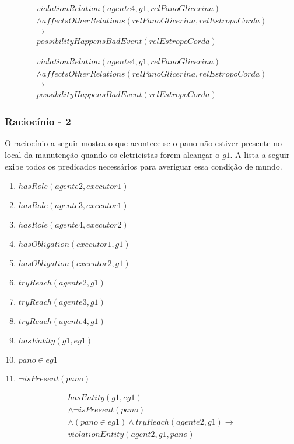 \begin{eqnarray}\nonumber
	violationRelation(agente4,g1,relPanoGlicerina)  \nonumber \\ 
	\wedge affectsOtherRelations(relPanoGlicerina,relEstropoCorda)   \nonumber \\ 
	\to \nonumber \\  
	possibilityHappensBadEvent(relEstropoCorda) 
\end{eqnarray}

\begin{eqnarray}\nonumber
	violationRelation(agente4,g1,relPanoGlicerina)  \nonumber \\ 
	\wedge affectsOtherRelations(relPanoGlicerina,relEstropoCorda)   \nonumber \\ 
	\to \nonumber \\  
	possibilityHappensBadEvent(relEstropoCorda) 
\end{eqnarray}



\subsubsection{Raciocínio - 2} 

O raciocínio a seguir mostra o que acontece se o pano não estiver presente no local da manutenção quando os eletricistas forem alcançar o $g1$. A lista a seguir exibe todos os predicados necessários para averiguar essa condição de mundo. 


\begin{enumerate}
	\item $hasRole(agente2,executor1)$ 
	\item $hasRole(agente3,executor1)$	 	
	\item $hasRole(agente4,executor2)$	 
	\item $hasObligation(executor1,g1)$
	\item $hasObligation(executor2,g1)$
	\item $tryReach(agente2,g1)$ 
	\item $tryReach(agente3,g1)$	 	
	\item $tryReach(agente4,g1)$	
	\item $hasEntity(g1,eg1)$		
	\item $pano \in eg1$
	\item $\neg isPresent(pano)$
\end{enumerate}

\begin{eqnarray}\nonumber
	hasEntity(g1,eg1) \nonumber \\ 
	\wedge \neg isPresent(pano) 	\nonumber \\ 
	\wedge (pano \in eg1) \wedge tryReach(agente2,g1) \to \nonumber \\ 
	violationEntity(agent2,g1,pano) \nonumber \\
\end{eqnarray}

